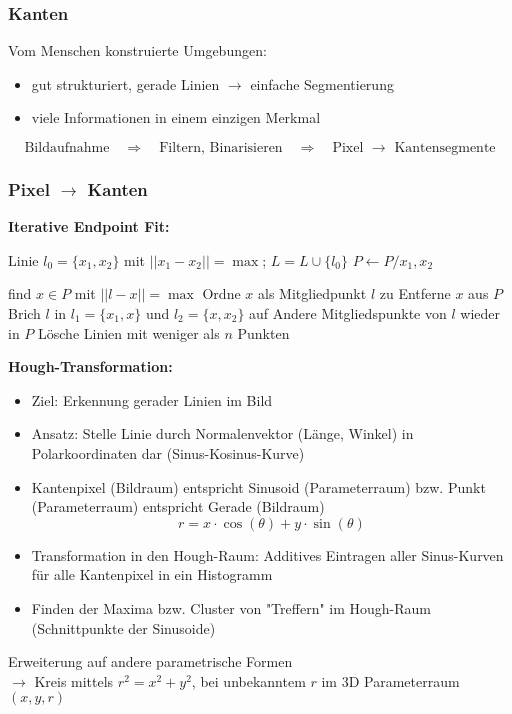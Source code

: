 \subsubsection{Kanten}

Vom Menschen konstruierte Umgebungen:
\begin{itemize}
\item gut strukturiert, gerade Linien $\to$ einfache Segmentierung
\item viele Informationen in einem einzigen Merkmal
\end{itemize}
$$\textrm{Bildaufnahme} \quad \Rightarrow \quad \textrm{Filtern, Binarisieren} \quad \Rightarrow \quad \textrm{Pixel } \to \textrm{ Kantensegmente}$$

\subsubsection*{Pixel $\to$ Kanten}

\textbf{Iterative Endpoint Fit:} \\[0,1cm]

\begin{algorithmic}
	\State Linie $l_0 = \{x_1,x_2\}$ mit $||x_1 - x_2|| = \max$; $L=L \cup \{l_0\}$
	\State $P \gets P / {x_1, x_2}$
	
		\State find $x \in P$ mit $||l-x|| = \max$
			\State Ordne $x$ als Mitgliedpunkt $l$ zu
			\State Entferne $x$ aus $P$
		\Else
			\State Brich $l$ in $l_1 = \{ x_1 , x\}$ und $l_2 = \{x , x_2 \}$ auf
			\State Andere Mitgliedspunkte von $l$ wieder in $P$	
		\EndIf
	\EndFor
	\EndWhile
	\State Lösche Linien mit weniger als $n$ Punkten
\end{algorithmic}


\textbf{Hough-Transformation:}
\begin{itemize}
\item Ziel: Erkennung gerader Linien im Bild
\item Ansatz: Stelle Linie durch Normalenvektor (Länge, Winkel) in Polarkoordinaten dar (Sinus-Kosinus-Kurve)
\item Kantenpixel (Bildraum) entspricht Sinusoid (Parameterraum) bzw. Punkt (Parameterraum) entspricht Gerade (Bildraum) $$r = x \cdot \cos(\theta) + y \cdot \sin(\theta)$$
\item Transformation in den Hough-Raum: Additives Eintragen aller Sinus-Kurven für alle Kantenpixel in ein Histogramm
\item Finden der Maxima bzw. Cluster von "{}Treffern"{} im Hough-Raum (Schnittpunkte der Sinusoide)
\end{itemize}
Erweiterung auf andere parametrische Formen \\
$\to$ Kreis mittels $r^2 = x^2 + y^2$, bei unbekanntem $r$ im 3D Parameterraum $(x, y, r)$

